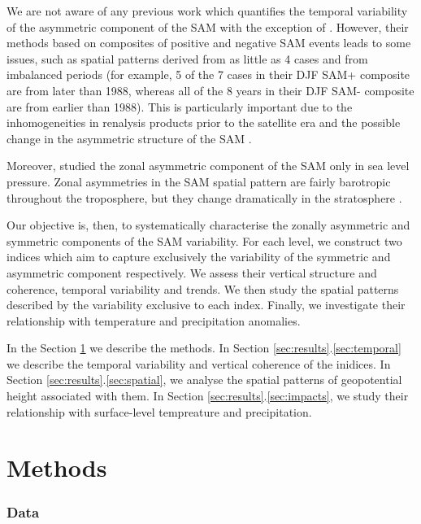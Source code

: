 \documentclass[]{ametsocV5}
\begin{document}
We are not aware of any previous work which quantifies the temporal
variability of the asymmetric component of the SAM with the exception of
\citet{fogt2012}. However, their methods based on composites of positive
and negative SAM events leads to some issues, such as spatial patterns
derived from as little as 4 cases and from imbalanced periods (for
example, 5 of the 7 cases in their DJF SAM+ composite are from later
than 1988, whereas all of the 8 years in their DJF SAM- composite are
from earlier than 1988). This is particularly important due to the
inhomogeneities in renalysis products prior to the satellite era and the
possible change in the asymmetric structure of the SAM
\citep{silvestri2009}.

Moreover, \citet{fogt2012} studied the zonal asymmetric component of the
SAM only in sea level pressure. Zonal asymmetries in the SAM spatial
pattern are fairly barotropic throughout the troposphere, but they
change dramatically in the stratosphere \citep{baldwin2009}.

Our objective is, then, to systematically characterise the zonally
asymmetric and symmetric components of the SAM variability. For each
level, we construct two indices which aim to capture exclusively the
variability of the symmetric and asymmetric component respectively. We
assess their vertical structure and coherence, temporal variability and
trends. We then study the spatial patterns described by the variability
exclusive to each index. Finally, we investigate their relationship with
temperature and precipitation anomalies.

In the Section \ref{sec:methods} we describe the methods. In Section
\ref{sec:results}.\ref{sec:temporal} we describe the temporal
variability and vertical coherence of the inidices. In Section
\ref{sec:results}.\ref{sec:spatial}, we analyse the spatial patterns of
geopotential height associated with them. In Section
\ref{sec:results}.\ref{sec:impacts}, we study their relationship with
surface-level tempreature and precipitation.

\section{Methods}

\label{sec:methods}

\subsubsection{Data}
\end{document}
